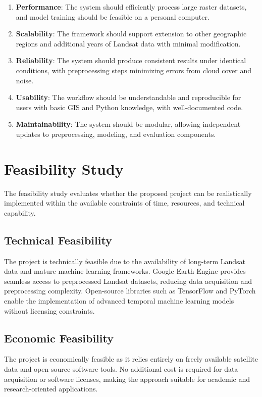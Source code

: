 \documentclass[main]{subfiles}
\begin{document}
\begin{enumerate}[label=\roman*.]
    \item \textbf{Performance}: The system should efficiently process large raster datasets, and model training should be feasible on a personal computer.
    
    \item \textbf{Scalability}: The framework should support extension to other geographic regions and additional years of Landsat data with minimal modification.
    
    \item \textbf{Reliability}: The system should produce consistent results under identical conditions, with preprocessing steps minimizing errors from cloud cover and noise.
    
    \item \textbf{Usability}: The workflow should be understandable and reproducible for users with basic GIS and Python knowledge, with well-documented code.
    
    \item \textbf{Maintainability}: The system should be modular, allowing independent updates to preprocessing, modeling, and evaluation components.
\end{enumerate}

\section{Feasibility Study}
The feasibility study evaluates whether the proposed project can be realistically implemented within the available constraints of time, resources, and technical capability.

\subsection{Technical Feasibility}
The project is technically feasible due to the availability of long-term Landsat data and mature machine learning frameworks. Google Earth Engine provides seamless access to preprocessed Landsat datasets, reducing data acquisition and preprocessing complexity. Open-source libraries such as TensorFlow and PyTorch enable the implementation of advanced temporal machine learning models without licensing constraints.

\subsection{Economic Feasibility}
The project is economically feasible as it relies entirely on freely available satellite data and open-source software tools. No additional cost is required for data acquisition or software licenses, making the approach suitable for academic and research-oriented applications.
\end{document}
